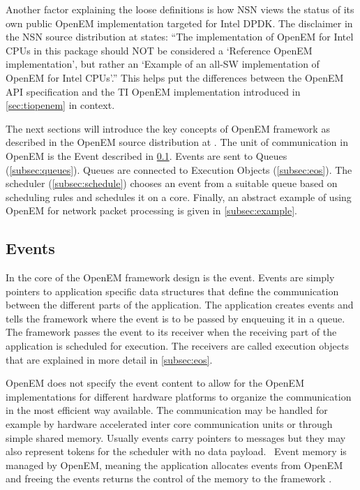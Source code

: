 Another factor explaining the loose definitions is how NSN views the status of its own public OpenEM implementation targeted for Intel DPDK. The disclaimer in the NSN source distribution at \cite{openempage} states: ``The implementation of OpenEM for Intel CPUs in this package should NOT be considered a `Reference OpenEM implementation', but rather an `Example of an all-SW implementation of OpenEM for Intel CPUs'.'' This helps put the differences between the OpenEM API specification and the TI OpenEM implementation introduced in \ref{sec:tiopenem} in context.

The next sections will introduce the key concepts of OpenEM framework as described in the OpenEM source distribution at \cite{openempage}. The unit of communication in OpenEM is the Event described in \ref{subsec:event}. Events are sent to Queues (\ref{subsec:queues}). Queues are connected to Execution Objects (\ref{subsec:eos}). The scheduler (\ref{subsec:schedule}) chooses an event from a suitable queue based on scheduling rules and schedules it on a core. Finally, an abstract example of using OpenEM for network packet processing is given in \ref{subsec:example}.

\subsection{Events}
\label{subsec:event}
In the core of the OpenEM framework design is the event. Events are simply pointers to application specific data structures that define the communication between the different parts of the application. The application creates events and tells the framework where the event is to be passed by enqueuing it in a queue. The framework passes the event to its receiver when the receiving part of the application is scheduled for execution. The receivers are called execution objects that are explained in more detail in \ref{subsec:eos}.~\cite{openemintro}

OpenEM does not specify the event content to allow for the OpenEM implementations for different hardware platforms to organize the communication in the most efficient way available. The communication may be handled for example by hardware accelerated inter core communication units or through simple shared memory. Usually events carry pointers to messages but they may also represent tokens for the scheduler with no data payload.~\cite{openemintro} Event memory is managed by OpenEM, meaning the application allocates events from OpenEM and freeing the events returns the control of the memory to the framework \cite{openemintro}.

